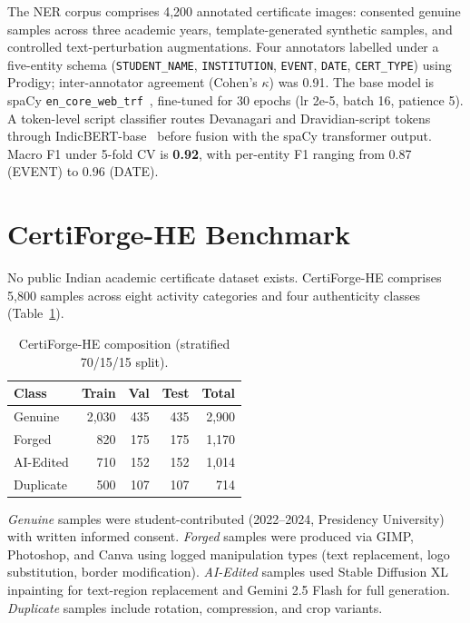 \documentclass[runningheads]{llncs}
\begin{document}
The NER corpus comprises 4{,}200 annotated certificate images: consented genuine samples across three academic years, template-generated synthetic samples, and controlled text-perturbation augmentations. Four annotators labelled under a five-entity schema (\texttt{STUDENT\_NAME}, \texttt{INSTITUTION}, \texttt{EVENT}, \texttt{DATE}, \texttt{CERT\_TYPE}) using Prodigy; inter-annotator agreement (Cohen's $\kappa$) was 0.91. The base model is spaCy \texttt{en\_core\_web\_trf}~\cite{spacy2017}, fine-tuned for 30 epochs (lr 2e-5, batch 16, patience 5). A token-level script classifier routes Devanagari and Dravidian-script tokens through IndicBERT-base~\cite{indic2020} before fusion with the spaCy transformer output. Macro F1 under 5-fold CV is \textbf{0.92}, with per-entity F1 ranging from 0.87 (EVENT) to 0.96 (DATE).

\section{CertiForge-HE Benchmark}
\label{sec:dataset}

No public Indian academic certificate dataset exists. CertiForge-HE comprises 5{,}800 samples across eight activity categories and four authenticity classes (Table~\ref{tab:dataset}).

\begin{table}[t]
\caption{CertiForge-HE composition (stratified 70/15/15 split).}
\label{tab:dataset}
\centering
\begin{tabular}{lrrrr}
\toprule
\textbf{Class} & \textbf{Train} & \textbf{Val} & \textbf{Test} & \textbf{Total} \\
\midrule
Genuine     & 2{,}030 & 435 & 435 & 2{,}900 \\
Forged      &    820 & 175 & 175 & 1{,}170 \\
AI-Edited   &    710 & 152 & 152 & 1{,}014 \\
Duplicate   &    500 & 107 & 107 &    714 \\
\bottomrule
\end{tabular}
\end{table}

\textit{Genuine} samples were student-contributed (2022--2024, Presidency University) with written informed consent. \textit{Forged} samples were produced via GIMP, Photoshop, and Canva using logged manipulation types (text replacement, logo substitution, border modification). \textit{AI-Edited} samples used Stable Diffusion XL inpainting for text-region replacement and Gemini 2.5 Flash for full generation. \textit{Duplicate} samples include rotation, compression, and crop variants.
\end{document}
